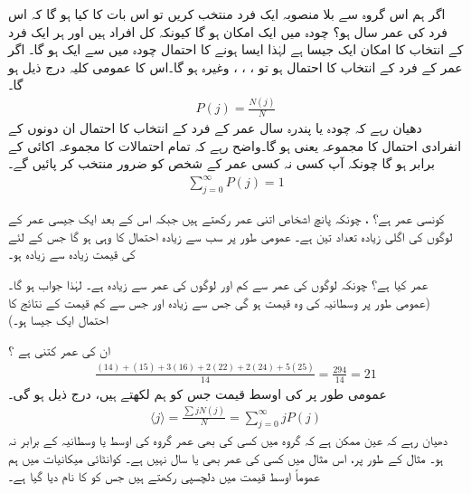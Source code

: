 \quad
اگر ہم اس گروہ سے بلا منصوبہ ایک فرد منتخب کریں تو اس بات کا کیا  ہو گا کہ اس فرد کی عمر  سال ہو؟
\quad
چودہ میں ایک امکان ہو گا کیونکہ کل  افراد ہیں اور ہر ایک فرد کے انتخاب کا امکان ایک جیسا ہے لہٰذا ایسا ہونے کا احتمال چودہ میں سے ایک ہو گا۔ اگر  عمر کے فرد کے انتخاب کا احتمال ہو تو ، ، ، وغیرہ ہو گا۔اس کا عمومی کلیہ درج ذیل ہو گا۔
\begin{align}
P(j) = \frac{N(j)}{N} 
\end{align}
دھیان رہے کہ چودہ یا پندرہ سال عمر کے فرد کے انتخاب کا احتمال ان دونوں کے انفرادی احتمال کا مجموعہ یعنی  ہو گا۔واضح رہے کہ تمام احتمالات کا مجموعہ اکائی  کے برابر ہو گا چونکہ آپ کسی نہ کسی عمر کے شخص کو ضرور منتخب کر پائیں گے۔ 
\begin{align}\label{مساوات_تفاعل_موج_کل_احتمال_اکائی}
\sum_{j=0}^{\infty} P(j) = 1
\end{align}

\quad
کونسی عمر  ہے؟
 \quad 
{}، چونکہ پانچ اشخاص اتنی عمر رکھتے ہیں جبکہ اس کے بعد ایک جیسی عمر کے لوگوں کی اگلی زیادہ تعداد تین ہے۔ عمومی طور پر سب سے زیادہ احتمال کا  وہی  ہو گا جس کے لئے کی قیمت زیادہ سے زیادہ ہو۔ 

  عمر کیا ہے؟ \quad
چونکہ  لوگوں کی عمر  سے کم اور  لوگوں کی عمر  سے زیادہ ہے۔ لہٰذا جواب  ہو گا۔ (عمومی طور پر وسطانیہ  کی وہ قیمت ہو گی جس سے زیادہ اور جس سے کم قیمت کے نتائج کا احتمال ایک جیسا ہو۔)

\quad
ان کی  عمر کتنی ہے ؟ 
\begin{align*}
 \frac{(14)+(15)+3(16)+2(22)+2(24)+5(25)}{14} = \frac{294}{14}=21 
\end{align*}
عمومی طور پر  کی اوسط قیمت جس کو ہم  لکھتے ہیں، درج ذیل ہو گی۔ 
\begin{align}\label{مساوات_تفاعل_موج_اوسط}
\langle j \rangle = \frac{\sum j N(j)}{N} = \sum_{j=0}^{\infty} jP(j) 
\end{align}
دھیان رہے کہ عین ممکن ہے کہ گروہ میں کسی کی بھی عمر گروہ کی اوسط یا وسطانیہ کے برابر نہ ہو۔ مثال کے طور پر، اس مثال میں کسی کی عمر بھی  یا  سال نہیں ہے۔ کوانٹائی میکانیات میں ہم عموماً اوسط قیمت میں دلچسپی رکھتے ہیں جس کو  کا نام دیا گیا ہے۔ 

